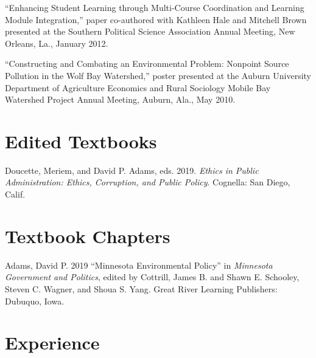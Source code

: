 \documentclass[11pt,letterpaper]{article}
\renewenvironment{itemize}{
  \begin{list}{}{
    \setlength{\leftmargin}{1.5em}
    \setlength{\itemsep}{0.25em}
    \setlength{\parskip}{0pt}
    \setlength{\parsep}{0.25em}
  }
}{
  \end{list}
}
\begin{document}
\begin{itemize}
		\item ``Enhancing Student Learning through Multi-Course Coordination and Learning Module Integration,'' paper co-authored with Kathleen Hale and Mitchell Brown presented at the Southern Political Science Association Annual Meeting, New Orleans, La., January 2012.
		
		\item ``Constructing and Combating an Environmental Problem: Nonpoint Source Pollution in the Wolf Bay Watershed,'' poster presented at the Auburn University Department of Agriculture Economics and Rural Sociology Mobile Bay Watershed Project Annual Meeting, Auburn, Ala., May 2010.
	\end{itemize}
	
\section*{Edited Textbooks}
	\begin{itemize}
		\item Doucette, Meriem, and David P. Adams, eds. 2019. \emph{Ethics in Public Administration: Ethics, Corruption, and Public Policy}. Cognella: San Diego, Calif. 
	\end{itemize}

\section*{Textbook Chapters}
	\begin{itemize}
		\item Adams, David P. 2019 ``Minnesota Environmental Policy'' in \textit{Minnesota Government and Politics}, edited by Cottrill, James B. and Shawn E. Schooley, Steven C. Wagner, and Shoua S. Yang. Great River Learning Publishers: Dubuquo, Iowa. 
	\end{itemize}
		
\section*{Experience}
\end{document}
